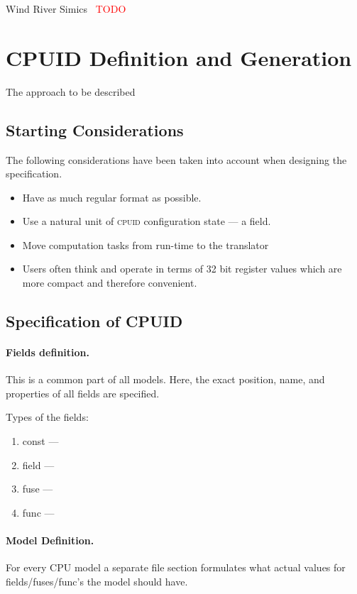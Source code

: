 \documentclass[a4paper,10pt,oneside,unicode]{article}
\newcommand{\cpuid}{\textsc{cpuid} }
\newcommand{\todo}[1][]{\textcolor{red}{TODO #1}}
\begin{document}
Wind River Simics~\cite{simics} \todo

\section{CPUID Definition and Generation}\label{sec:cpuidgen}

The approach to be described 

\subsection{Starting Considerations}

The following considerations have been taken into account when designing the specification.

\begin{itemize}
\item Have as much regular format as possible.
\item Use a natural unit of \cpuid configuration state --- a field.
\item Move computation tasks from run-time to the translator
\item Users often think and operate in terms of 32 bit register values which are more compact and therefore convenient.
\end{itemize}

\subsection{Specification of CPUID}
\paragraph{Fields definition.} This is a common part of all models. Here, the exact position, name, and properties of all fields are specified.

Types of the fields:
\begin{enumerate}
    \item const ---
    \item field ---
    \item fuse ---
    \item func --- 
\end{enumerate}

\paragraph{Model Definition.} For every CPU model a separate file section formulates what actual values for fields/fuses/func's the model should have. 
\end{document}
